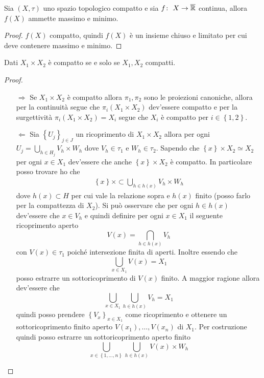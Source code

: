 \begin{corollary}[Weierstrass]
	Sia $(X, \tau)$ uno spazio topologico compatto e sia $f \colon\ X \rightarrow \overline{\mathbb{R}}$ continua, allora $f(X)$ ammette massimo e minimo.
\end{corollary} 
\begin{proof}
	$f(X)$ compatto, quindi $f(X)$ è un insieme chiuso e limitato per cui deve contenere massimo e minimo.
\end{proof}

\begin{theorem}[Tychonoff]
	Dati $X_1 \times X_2$ è compatto se e solo se $X_1,X_2$ compatti. 
\end{theorem} 
\begin{proof}
	\begin{enumerate}
		\item[$\Rightarrow$] Se $X_1 \times X_2$ è compatto allora $\pi_1, \pi_2$ sono le proiezioni canoniche, allora per la continuità segue che $\pi_i(X_1 \times X_2)$ dev'essere compatto e per la surgettività $ \pi_i(X_1 \times X_2) = X_i$  segue che $X_i$ è compatto per $i \in \left\{1,2\right\}$.
		\item[$\Leftarrow$] Sia $\left\{U_j\right\}_{j \in J}$ un ricoprimento di $X_1 \times X_2$ allora per ogni $U_j = \bigcup_{h \in H_j} V_h \times W_h$ dove $V_h \in \tau_1$ e $W_h \in \tau_2$. Sapendo che $\left\{x\right\} \times X_2 \simeq X_2$ per ogni  $x \in X_1$ dev'essere che anche $\left\{x\right\} \times X_2$ è compatto. In particolare posso trovare ho che 
		\begin{equation}
		\begin{aligned}
			\left\{x\right\} \times \subset \bigcup_{h \in h(x)} V_h \times W_h
		\end{aligned}
		\end{equation}
		dove $h(x) \subset H$ per cui vale la relazione sopra e $h(x)$ finito (posso farlo per la compattezza di $X_2$). Si può osservare che per ogni $h \in h(x)$ dev'essere che $x \in V_h$ e quindi definire per ogni $x \in X_1$ il seguente ricoprimento aperto 
		\begin{equation*}
			V(x) = \bigcap_{h \in h(x)} V_h
		\end{equation*}
		con $V(x) \in \tau_1$ poiché intersezione finita di aperti. Inoltre essendo che 
		\begin{equation*}
			\bigcup_{x \in X_1} V(x) = X_1
		\end{equation*}
		posso estrarre un sottoricoprimento di $V(x)$ finito. A maggior ragione allora dev'essere che 
		\begin{equation*}
			\bigcup_{x \in X_1} \bigcup_{h \in h(x)} V_h = X_1
		\end{equation*} 
		quindi posso prendere $\left\{V_x\right\}_{x \in X_1}$ come ricoprimento e ottenere un sottoricoprimento finito aperto $V(x_1), \dots, V(x_n)$ di $X_1$.
		Per costruzione quindi posso estrarre un sottoricoprimento aperto finito  
		\begin{equation*}
			\bigcup_{x \in \left\{1,\dots, n\right\}} \bigcup_{h \in h(x)} V(x) \times W_h
		\end{equation*}
	\end{enumerate}
\end{proof}

